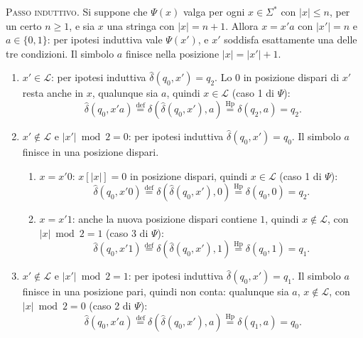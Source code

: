\documentclass[a4paper, 11pt, oneside]{book}
\theoremstyle{formale}
\begin{document}
    \textsc{Passo induttivo}. Si suppone che $\Psi(x)$ valga per ogni $x \in \Sigma^*$ con
    $|x| \leq n$, per un certo $n \geq 1$, e sia $x$ una stringa con $|x| = n + 1$. Allora
    $x = x'a$ con $|x'| = n$ e $a \in \{0, 1\}$: per ipotesi induttiva vale $\Psi(x')$, e
    $x'$ soddisfa esattamente una delle tre condizioni. Il simbolo $a$ finisce nella
    posizione $|x| = |x'| + 1$.
    \begin{enumerate}
        \item $x' \in \mathcal{L}$: per ipotesi induttiva $\hat{\delta}(q_0, x') = q_2$.
            Lo $0$ in posizione dispari di $x'$ resta anche in $x$, qualunque sia $a$,
            quindi $x \in \mathcal{L}$ (caso 1 di $\Psi$):
            \begin{equation*}
                \hat{\delta}(q_0, x'a)
                \overset{\text{def}}{=} \delta(\hat{\delta}(q_0, x'), a)
                \overset{\text{Hp}}{=} \delta(q_2, a) = q_2.
            \end{equation*}
        \item $x' \notin \mathcal{L}$ e $|x'| \bmod 2 = 0$: per ipotesi induttiva
            $\hat{\delta}(q_0, x') = q_0$. Il simbolo $a$ finisce in una posizione
            dispari.
            \begin{enumerate}[label=\arabic{enumi}\alph*.]
                \item $x = x'0$: $x[|x|] = 0$ in posizione dispari, quindi
                    $x \in \mathcal{L}$ (caso 1 di $\Psi$):
                    \begin{equation*}
                        \hat{\delta}(q_0, x'0)
                        \overset{\text{def}}{=} \delta(\hat{\delta}(q_0, x'), 0)
                        \overset{\text{Hp}}{=} \delta(q_0, 0) = q_2.
                    \end{equation*}
                \item $x = x'1$: anche la nuova posizione dispari contiene $1$, quindi
                    $x \notin \mathcal{L}$, con $|x| \bmod 2 = 1$ (caso 3 di $\Psi$):
                    \begin{equation*}
                        \hat{\delta}(q_0, x'1)
                        \overset{\text{def}}{=} \delta(\hat{\delta}(q_0, x'), 1)
                        \overset{\text{Hp}}{=} \delta(q_0, 1) = q_1.
                    \end{equation*}
            \end{enumerate}
        \item $x' \notin \mathcal{L}$ e $|x'| \bmod 2 = 1$: per ipotesi induttiva
            $\hat{\delta}(q_0, x') = q_1$. Il simbolo $a$ finisce in una posizione pari,
            quindi non conta: qualunque sia $a$, $x \notin \mathcal{L}$, con
            $|x| \bmod 2 = 0$ (caso 2 di $\Psi$):
            \begin{equation*}
                \hat{\delta}(q_0, x'a)
                \overset{\text{def}}{=} \delta(\hat{\delta}(q_0, x'), a)
                \overset{\text{Hp}}{=} \delta(q_1, a) = q_0.
            \end{equation*}
    \end{enumerate}
\end{document}
